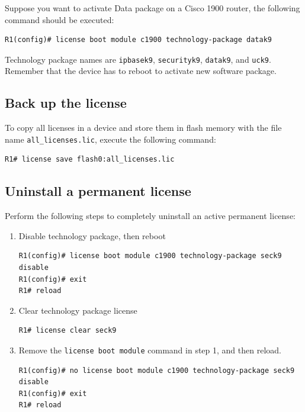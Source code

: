 Suppose you want to activate Data package on a Cisco 1900 router, the following command should be executed:

\begin{verbatim}
R1(config)# license boot module c1900 technology-package datak9
\end{verbatim}

Technology package names are \verb|ipbasek9|, \verb|securityk9|, \verb|datak9|, and \verb|uck9|.\\

Remember that the device has to reboot to activate new software package.

\subsection{Back up the license}

To copy all licenses in a device and store them in flash memory with the file name \verb|all_licenses.lic|, execute the following command:

\begin{verbatim}
R1# license save flash0:all_licenses.lic
\end{verbatim}

\subsection{Uninstall a permanent license}

Perform the following steps to completely uninstall an active permanent license:

\begin{enumerate}
\item Disable technology package, then reboot

\begin{verbatim}
R1(config)# license boot module c1900 technology-package seck9 disable
R1(config)# exit
R1# reload
\end{verbatim}

\item Clear technology package license

\begin{verbatim}
R1# license clear seck9
\end{verbatim}

\item Remove the \verb|license boot module| command in step 1, and then reload.

\begin{verbatim}
R1(config)# no license boot module c1900 technology-package seck9 disable
R1(config)# exit
R1# reload
\end{verbatim}

\end{enumerate}